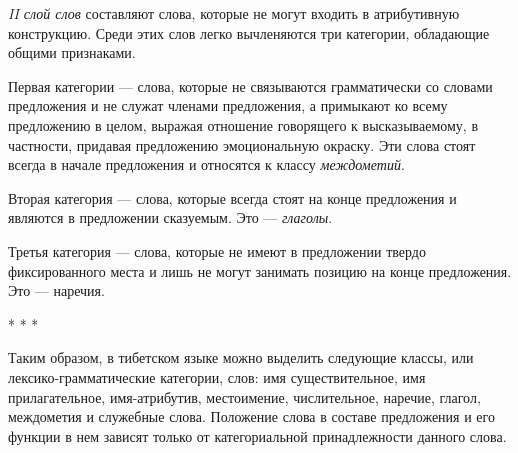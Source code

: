 \emph{II слой слов} составляют слова, которые не могут входить в атрибутивную конструкцию. Среди этих слов легко вычленяются три категории, обладающие общими признаками.

Первая категории --- слова, которые не связываются грамматически со словами предложения и не служат членами предложения, а примыкают ко всему предложению в целом, выражая отношение говорящего к высказываемому, в частности, придавая предложению эмоциональную окраску. Эти слова стоят всегда в начале предложения и относятся к классу \emph{междометий}.

Вторая категория --- слова, которые всегда стоят на конце предложения и являются в предложении сказуемым. Это --- \emph{глаголы}.

Третья категория --- слова, которые не имеют в предложении твердо фиксированного места и лишь не могут занимать позицию на конце предложения. Это --- наречия.

\begin{center}
* * *
\end{center}

Таким образом, в тибетском языке можно выделить следующие классы, или лексико-грамматические категории, слов: имя существительное, имя прилагательное, имя-атрибутив, местоимение, числительное, наречие, глагол, междометия и служебные слова. Положение слова в составе предложения и его функции в нем зависят только от категориальной принадлежности данного слова.